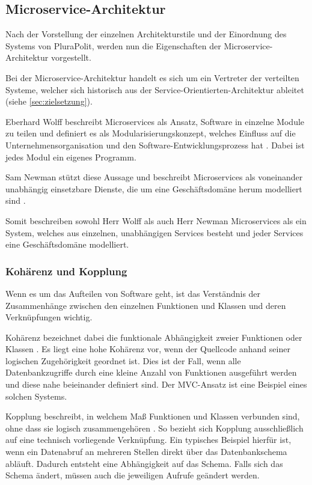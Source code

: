 \subsection{Microservice-Architektur}
\label{sec:microservices}

Nach der Vorstellung der einzelnen Architekturstile und der Einordnung des Systems von PluraPolit, werden nun die Eigenschaften der Microservice-Architektur vorgestellt.

Bei der Microservice-Architektur handelt es sich um ein Vertreter der verteilten Systeme, welcher sich historisch aus der Service-Orientierten-Architektur ableitet (siehe \cref{sec:zielsetzung}).

Eberhard Wolff beschreibt Microservices als Ansatz, Software in einzelne Module zu teilen und definiert es als Modularisierungskonzept, welches Einfluss auf die Unternehmensorganisation und den Software-Entwicklungsprozess hat \parencite[vgl.][Kap. 1.1]{wolff_microservices_2018}. Dabei ist jedes Modul ein eigenes Programm.

Sam Newman stützt diese Aussage und beschreibt Microservices als voneinander unabhängig einsetzbare Dienste, die um eine Geschäftsdomäne herum modelliert sind \parencite[vgl.][Kap. 2.1]{newman_monolith_2019}.

Somit beschreiben sowohl Herr Wolff als auch Herr Newman Microservices als ein System, welches aus einzelnen, unabhängigen Services besteht und jeder Services eine Geschäftsdomäne modelliert.

\subsubsection{Kohärenz und Kopplung}

Wenn es um das Aufteilen von Software geht, ist das Verständnis der Zusammenhänge zwischen den einzelnen Funktionen und Klassen und deren Verknüpfungen wichtig.

Kohärenz bezeichnet dabei die funktionale Abhängigkeit zweier Funktionen oder Klassen \parencite[vgl.][Kap. 2.3.1]{newman_monolith_2019}.
Es liegt eine hohe Kohärenz vor, wenn der Quellcode anhand seiner logischen Zugehörigkeit geordnet ist.
Dies ist der Fall, wenn alle Datenbankzugriffe durch eine kleine Anzahl von Funktionen ausgeführt werden und diese nahe beieinander definiert sind. Der MVC-Ansatz ist eine Beispiel eines solchen Systems.

Kopplung beschreibt, in welchem Maß Funktionen und Klassen verbunden sind, ohne dass sie logisch zusammengehören \parencite[vgl.][Kap. 2.3.2]{newman_monolith_2019}. So bezieht sich Kopplung ausschließlich auf eine technisch vorliegende Verknüpfung. Ein typisches Beispiel hierfür ist, wenn ein Datenabruf an mehreren Stellen direkt über das Datenbankschema abläuft. Dadurch entsteht eine Abhängigkeit auf das Schema. Falls sich das Schema ändert, müssen auch die jeweiligen Aufrufe geändert werden.

